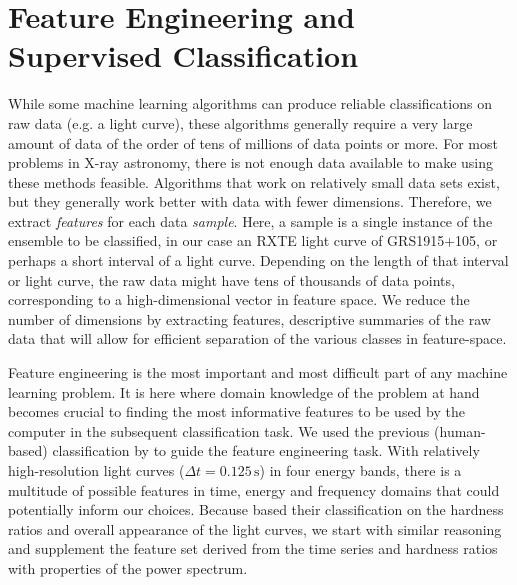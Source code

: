 \documentclass[12pt]{emulateapj}
\begin{document}
\section{Feature Engineering and Supervised Classification}

While some machine learning algorithms can produce reliable classifications on raw data (e.g. a light curve), these algorithms generally require a very large amount of data of the order of tens of millions of data points or more. 
For most problems in X-ray astronomy, there is not enough data available to make using these methods feasible. Algorithms that work on relatively small data sets exist, but they generally work better with data with fewer dimensions. Therefore, we extract \textit{features} for each data \textit{sample}. 
Here, a sample is a single instance of the ensemble to be classified, in our case an RXTE light curve of GRS1915+105, or perhaps a short interval of a light curve. Depending on the length of that interval or light curve, the raw data might have tens of thousands of data points, corresponding to a high-dimensional vector in feature space. We reduce the number of dimensions by extracting features, descriptive summaries of the raw data that will allow for efficient separation of the various classes in feature-space. 

Feature engineering is the most important and most difficult part of any machine learning problem. It is here where domain knowledge of the problem at hand becomes crucial to finding the most informative features to be used by the computer in the subsequent classification task. 
We used the previous (human-based) classification by \citet{belloni2000} to guide the feature engineering task. With relatively high-resolution light curves ($\Delta t = 0.125 \,\mathrm{s}$) in four energy bands, there is a multitude of possible features in time, energy and frequency domains that could potentially inform our choices. Because \citet{belloni2000} based their classification on the hardness ratios and overall appearance of the light curves, we start with similar reasoning and supplement the feature set derived from the time series and hardness ratios with properties of the power spectrum. 
\end{document}
